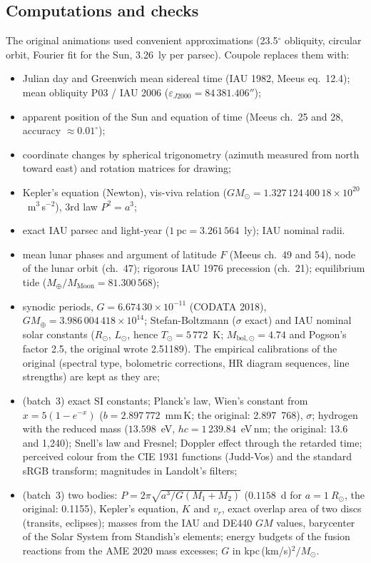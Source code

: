 \subsection{Computations and checks}
The original animations used convenient approximations (23.5$^\circ$ obliquity, circular orbit, Fourier fit for the
Sun, 3.26~ly per parsec). Coupole replaces them with:
\begin{itemize}
\item Julian day and Greenwich mean sidereal time (IAU 1982, Meeus eq.~12.4); mean obliquity P03 / IAU 2006
      ($\varepsilon_{J2000}=84\,381.406''$);
\item apparent position of the Sun and equation of time (Meeus ch.~25 and 28, accuracy $\approx 0.01^\circ$);
\item coordinate changes by spherical trigonometry (azimuth measured from north toward east) and rotation matrices
      for drawing;
\item Kepler's equation (Newton), vis-viva relation ($GM_\odot = 1.327\,124\,400\,18\times10^{20}$~m$^3$\,s$^{-2}$),
      3rd law $P^2=a^3$;
\item exact IAU parsec and light-year ($1~\mathrm{pc}=3.261\,564$~ly); IAU nominal radii.
\item mean lunar phases and argument of latitude $F$ (Meeus ch.~49 and 54), node of the lunar orbit (ch.~47);
      rigorous IAU 1976 precession (ch.~21); equilibrium tide ($M_\oplus/M_{\mathrm{Moon}}=81.300\,568$);
\item synodic periods, $G=6.674\,30\times10^{-11}$ (CODATA 2018), $GM_\oplus=3.986\,004\,418\times10^{14}$;
      Stefan-Boltzmann ($\sigma$ exact) and IAU nominal solar constants ($R_\odot$, $L_\odot$, hence $T_\odot=5\,772$~K;
      $M_{\text{bol},\odot}=4.74$ and Pogson's factor 2.5, the original wrote 2.51189). The empirical calibrations of
      the original (spectral type, bolometric corrections, HR diagram sequences, line strengths) are kept as they are;
\item (batch~3) exact SI constants; Planck's law, Wien's constant from $x=5(1-e^{-x})$ ($b=2.897\,772$~mm\,K; the
      original: 2.897~768), $\sigma$; hydrogen with the reduced mass ($13.598$~eV, $hc=1\,239.84$~eV\,nm; the
      original: 13.6 and 1,240); Snell's law and Fresnel; Doppler effect through the retarded time; perceived colour
      from the CIE 1931 functions (Judd-Vos) and the standard sRGB transform; magnitudes in Landolt's filters;
\item (batch~3) two bodies: $P=2\pi\sqrt{a^3/G(M_1+M_2)}$ ($0.1158$~d for $a=1~R_\odot$, the original: 0.1155),
      Kepler's equation, $K$ and $v_r$, exact overlap area of two discs (transits, eclipses); masses from the IAU and
      DE440 $GM$ values, barycenter of the Solar System from Standish's elements; energy budgets of the fusion
      reactions from the AME 2020 mass excesses; $G$ in kpc\,(km/s)$^2/M_\odot$.
\end{itemize}
